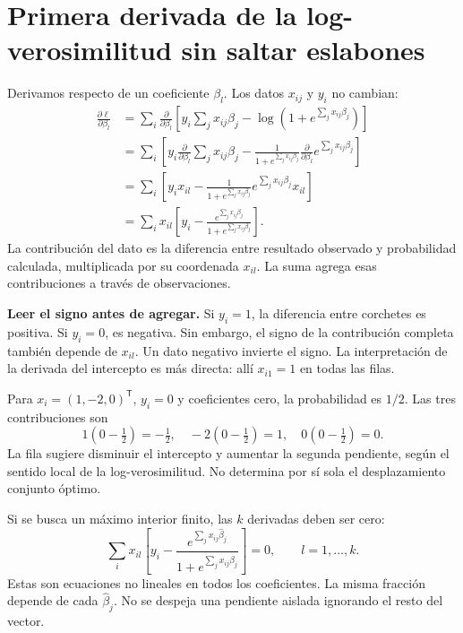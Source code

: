 \documentclass[11pt,a4paper]{article}
\newcommand{\T}{^{\mathsf T}}
\begin{document}
\clearpage
\section{Primera derivada de la log-verosimilitud sin saltar eslabones}\label{logit15}
Derivamos respecto de un coeficiente $\beta_l$.
Los datos $x_{ij}$ y $y_i$ no cambian:
\[
\begin{aligned}
\frac{\partial\ell}{\partial\beta_l}
&=\sum_i\frac{\partial}{\partial\beta_l}
\left[y_i\sum_jx_{ij}\beta_j-
\log(1+e^{\sum_jx_{ij}\beta_j})\right]\\
&=\sum_i\left[
y_i\frac{\partial}{\partial\beta_l}\sum_jx_{ij}\beta_j
-\frac1{1+e^{\sum_jx_{ij}\beta_j}}
\frac{\partial}{\partial\beta_l}e^{\sum_jx_{ij}\beta_j}
\right]\\
&=\sum_i\left[
y_ix_{il}-
\frac1{1+e^{\sum_jx_{ij}\beta_j}}
e^{\sum_jx_{ij}\beta_j}x_{il}\right]\\
&=\boxed{\sum_i x_{il}\left[
y_i-\frac{e^{\sum_jx_{ij}\beta_j}}{1+e^{\sum_jx_{ij}\beta_j}}
\right]}.
\end{aligned}
\]
La contribución del dato es la diferencia entre resultado observado
y probabilidad calculada, multiplicada por su coordenada $x_{il}$.
La suma agrega esas contribuciones a través de observaciones.

\textbf{Leer el signo antes de agregar.}
Si $y_i=1$, la diferencia entre corchetes es positiva.
Si $y_i=0$, es negativa.
Sin embargo, el signo de la contribución completa también depende
de $x_{il}$. Un dato negativo invierte el signo.
La interpretación de la derivada del intercepto es más directa:
allí $x_{i1}=1$ en todas las filas.

\begin{ejemplo}
Para $x_i=(1,-2,0)\T$, $y_i=0$ y coeficientes cero,
la probabilidad es $1/2$. Las tres contribuciones son
\[
1(0-\tfrac12)=-\tfrac12,\quad
-2(0-\tfrac12)=1,\quad
0(0-\tfrac12)=0.
\]
La fila sugiere disminuir el intercepto y aumentar la segunda pendiente,
según el sentido local de la log-verosimilitud.
No determina por sí sola el desplazamiento conjunto óptimo.
\end{ejemplo}
Si se busca un máximo interior finito, las $k$ derivadas deben ser cero:
\[
\sum_i x_{il}\left[y_i-
\frac{e^{\sum_jx_{ij}\widehat\beta_j}}
{1+e^{\sum_jx_{ij}\widehat\beta_j}}\right]=0,
\qquad l=1,\ldots,k.
\]
Estas son ecuaciones no lineales en todos los coeficientes.
La misma fracción depende de cada $\widehat\beta_j$.
No se despeja una pendiente aislada ignorando el resto del vector.
\end{document}
